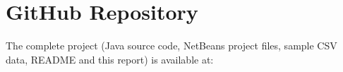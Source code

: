 \section{GitHub Repository}
The complete project (Java source code, NetBeans project files, sample CSV data, README and this report) is available at:\\
\githubLink
